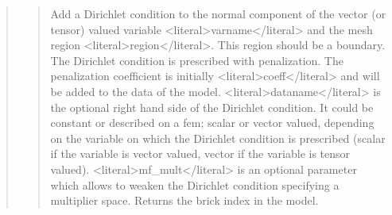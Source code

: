 \documentclass[a4paper,11pt,english]{sphinxmanual}
\begin{document}
\begin{quote}
\begin{quote}
\sphinxAtStartPar
Add a Dirichlet condition to the normal component of the vector
(or tensor) valued variable \textless{}literal\textgreater{}varname\textless{}/literal\textgreater{} and the mesh
region \textless{}literal\textgreater{}region\textless{}/literal\textgreater{}. This region should be a boundary. The Dirichlet
condition is prescribed with penalization. The penalization coefficient
is initially \textless{}literal\textgreater{}coeff\textless{}/literal\textgreater{} and will be added to the data of the model.
\textless{}literal\textgreater{}dataname\textless{}/literal\textgreater{} is the optional right hand side of the Dirichlet condition.
It could be constant or described on a fem; scalar or vector valued,
depending on the variable on which the Dirichlet condition is prescribed
(scalar if the variable
is vector valued, vector if the variable is tensor valued).
\textless{}literal\textgreater{}mf\_mult\textless{}/literal\textgreater{} is an optional parameter which allows to weaken the
Dirichlet condition specifying a multiplier space.
Returns the brick index in the model.
\end{quote}

\sphinxAtStartPar
{}
\begin{quote}


\end{quote}
\end{quote}
\end{document}
